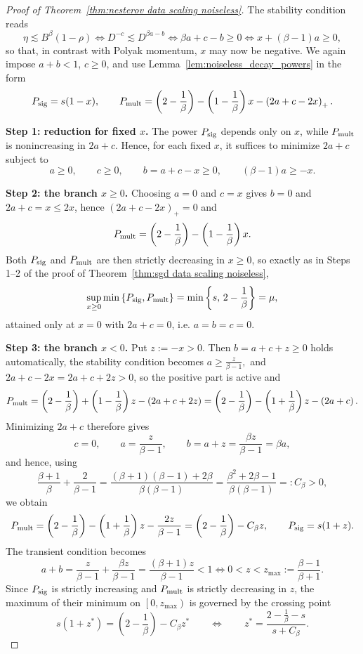 \begin{proof}[Proof of Theorem~\ref{thm:nesterov data scaling noiseless}]
The stability condition reads
\[
    \eta\lesssim B^{\beta}(1-\rho)
    \iff
    D^{-c}\lesssim D^{\beta a-b}
    \iff
    \beta a+c-b\geq0
    \iff
    x+(\beta-1)a\geq0 ,
\]
so that, in contrast with Polyak momentum, \(x\) may now be negative. We again impose \(a+b<1\), \(c\geq0\), and use Lemma~\ref{lem:noiseless_decay_powers} in the form
\[
    P_{\rm sig}=s(1-x),
    \qquad
    P_{\rm mult}
    =
    \left(2-\frac1\beta\right)-\left(1-\frac1\beta\right)x-\left(2a+c-2x\right)_{+}.
\]

\textbf{Step 1: reduction for fixed \(x\).} The power \(P_{\rm sig}\) depends only on \(x\), while \(P_{\rm mult}\) is nonincreasing in \(2a+c\). Hence, for each fixed \(x\), it suffices to minimize \(2a+c\) subject to
\[
    a\geq0,
    \qquad
    c\geq0,
    \qquad
    b=a+c-x\geq0,
    \qquad
    (\beta-1)a\geq-x .
\]

\textbf{Step 2: the branch \(x\geq0\).} Choosing \(a=0\) and \(c=x\) gives \(b=0\) and \(2a+c=x\leq2x\), hence \(\left(2a+c-2x\right)_{+}=0\) and
\[
    P_{\rm mult}=\left(2-\frac1\beta\right)-\left(1-\frac1\beta\right)x .
\]
Both \(P_{\rm sig}\) and \(P_{\rm mult}\) are then strictly decreasing in \(x\geq0\), so exactly as in Steps 1--2 of the proof of Theorem~\ref{thm:sgd data scaling noiseless},
\[
    \sup_{x\geq0}\min\left\{P_{\rm sig},P_{\rm mult}\right\}
    =
    \min\left\{s,\,2-\frac1\beta\right\}
    =
    \mu ,
\]
attained only at \(x=0\) with \(2a+c=0\), i.e. \(a=b=c=0\).

\textbf{Step 3: the branch \(x<0\).} Put \(z:=-x>0\). Then \(b=a+c+z\geq0\) holds automatically, the stability condition becomes $ a\geq\frac{z}{\beta-1},$
and \(2a+c-2x=2a+c+2z>0\), so the positive part is active and
\[
    P_{\rm mult}
    =
    \left(2-\frac1\beta\right)+\left(1-\frac1\beta\right)z-\left(2a+c+2z\right)
    =
    \left(2-\frac1\beta\right)-\left(1+\frac1\beta\right)z-\left(2a+c\right).
\]
Minimizing \(2a+c\) therefore gives
\[
    c=0,
    \qquad
    a=\frac{z}{\beta-1},
    \qquad
    b=a+z=\frac{\beta z}{\beta-1}=\beta a ,
\]
and hence, using
\[
    \frac{\beta+1}{\beta}+\frac{2}{\beta-1}
    =
    \frac{(\beta+1)(\beta-1)+2\beta}{\beta(\beta-1)}
    =
    \frac{\beta^{2}+2\beta-1}{\beta(\beta-1)}
    =:C_{\beta}>0,
\]
we obtain
\[
    P_{\rm mult}
    =
    \left(2-\frac1\beta\right)-\left(1+\frac1\beta\right)z-\frac{2z}{\beta-1}
    =
    \left(2-\frac1\beta\right)-C_{\beta}z ,
    \qquad
    P_{\rm sig}=s(1+z).
\]
The transient condition becomes
\[
    a+b=\frac{z}{\beta-1}+\frac{\beta z}{\beta-1}=\frac{(\beta+1)z}{\beta-1}<1
    \iff
    0<z<z_{\max}:=\frac{\beta-1}{\beta+1}.
\]
Since \(P_{\rm sig}\) is strictly increasing and \(P_{\rm mult}\) is strictly decreasing in \(z\), the maximum of their minimum on \(\left[0,z_{\max}\right)\) is governed by the crossing point
\[
    s(1+z^{*})=\left(2-\frac1\beta\right)-C_{\beta}z^{*}
    \qquad\Longleftrightarrow\qquad
    z^{*}=\frac{2-\frac1\beta-s}{s+C_{\beta}} .
\]


\end{proof}
